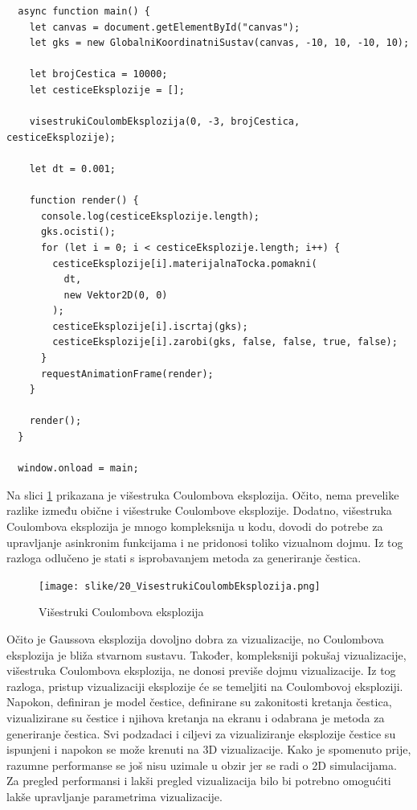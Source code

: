 \documentclass{foi}
\begin{document}
\begin{verbatim}
  async function main() {
    let canvas = document.getElementById("canvas");
    let gks = new GlobalniKoordinatniSustav(canvas, -10, 10, -10, 10);

    let brojCestica = 10000;
    let cesticeEksplozije = [];

    visestrukiCoulombEksplozija(0, -3, brojCestica, cesticeEksplozije);

    let dt = 0.001;

    function render() {
      console.log(cesticeEksplozije.length);
      gks.ocisti();
      for (let i = 0; i < cesticeEksplozije.length; i++) {
        cesticeEksplozije[i].materijalnaTocka.pomakni(
          dt,
          new Vektor2D(0, 0)
        );
        cesticeEksplozije[i].iscrtaj(gks);
        cesticeEksplozije[i].zarobi(gks, false, false, true, false);
      }
      requestAnimationFrame(render);
    }

    render();
  }

  window.onload = main;
\end{verbatim}

Na slici \ref{fig:VisestrukiCoulombEksplozija} prikazana je višestruka Coulombova eksplozija. Očito, nema prevelike razlike između obične i višestruke Coulombove eksplozije. Dodatno, višestruka Coulombova eksplozija je mnogo kompleksnija u kodu, dovodi do potrebe za upravljanje asinkronim funkcijama i ne pridonosi toliko vizualnom dojmu. Iz tog razloga odlučeno je stati s isprobavanjem metoda za generiranje čestica. 

\begin{figure}[H]
    \centering
    \texttt{[image: slike/20\_VisestrukiCoulombEksplozija.png]}
    \captionsetup{justification=centering}
    \caption{Višestruki Coulombova eksplozija}
\label{fig:VisestrukiCoulombEksplozija}
\end{figure}

Očito je Gaussova eksplozija dovoljno dobra za vizualizacije, no Coulombova eksplozija je bliža stvarnom sustavu. Također, kompleksniji pokušaj vizualizacije, višestruka Coulombova eksplozija, ne donosi previše dojmu vizualizacije. Iz tog razloga, pristup vizualizaciji eksplozije će se temeljiti na Coulombovoj eksploziji. Napokon, definiran je model čestice, definirane su zakonitosti kretanja čestica, vizualizirane su čestice i njihova kretanja na ekranu i odabrana je metoda za generiranje čestica. Svi podzadaci i ciljevi za vizualiziranje eksplozije čestice su ispunjeni i napokon se može krenuti na 3D vizualizacije. Kako je spomenuto prije, razumne performanse se još nisu uzimale u obzir jer se radi o 2D simulacijama. Za pregled performansi i lakši pregled vizualizacija bilo bi potrebno omogućiti lakše upravljanje parametrima vizualizacije.
\end{document}
